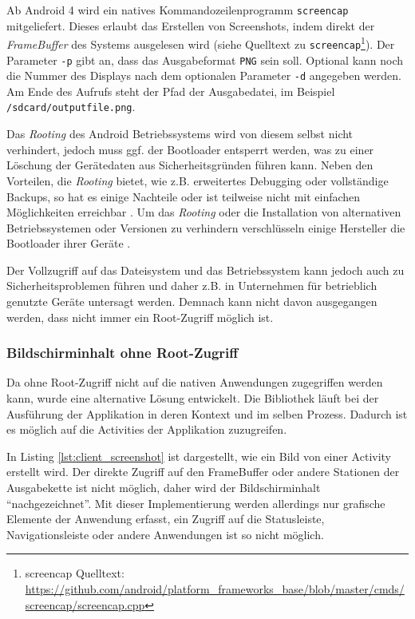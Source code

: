 Ab Android 4 wird ein natives Kommandozeilenprogramm \texttt{screencap} mitgeliefert.
Dieses erlaubt das Erstellen von Screenshots, indem direkt der \emph{FrameBuffer} des Systems ausgelesen wird (siehe Quelltext zu \texttt{screencap}\footnote{screencap Quelltext: \url{https://github.com/android/platform_frameworks_base/blob/master/cmds/screencap/screencap.cpp}}).
Der Parameter \texttt{-p} gibt an, dass das Ausgabeformat \texttt{PNG} sein soll. 
Optional kann noch die Nummer des Displays nach dem optionalen Parameter \texttt{-d} angegeben werden.
Am Ende des Aufrufs steht der Pfad der Ausgabedatei, im Beispiel \texttt{/sdcard/outputfile.png}. 

Das \emph{Rooting} des Android Betriebssystems wird von diesem selbst nicht verhindert, jedoch muss ggf. der Bootloader entsperrt werden, was zu einer Löschung der Gerätedaten aus Sicherheitsgründen führen kann. 
Neben den Vorteilen, die \emph{Rooting} bietet, wie z.B. erweitertes Debugging oder vollständige Backups, so hat es einige Nachteile oder ist teilweise nicht mit einfachen Möglichkeiten erreichbar \cite[vgl.][]{androidsecurity}.
Um das \emph{Rooting} oder die Installation von alternativen Betriebssystemen oder Versionen zu verhindern verschlüsseln einige Hersteller die Bootloader ihrer Geräte \cite[vgl.][6\psq]{androiddataintegrity}.

Der Vollzugriff auf das Dateisystem und das Betriebssystem kann jedoch auch zu Sicherheitsproblemen führen und daher z.B. in Unternehmen für betrieblich genutzte Geräte untersagt werden.
Demnach kann nicht davon ausgegangen werden, dass nicht immer ein Root-Zugriff möglich ist.

\subsubsection{Bildschirminhalt ohne Root-Zugriff}
Da ohne Root-Zugriff nicht auf die nativen Anwendungen zugegriffen werden kann, wurde eine alternative Lösung entwickelt.
Die Bibliothek läuft bei der Ausführung der Applikation in deren Kontext und im selben Prozess.
Dadurch ist es möglich auf die Activities der Applikation zuzugreifen.

In Listing \ref{lst:client_screenshot} ist dargestellt, wie ein Bild von einer Activity erstellt wird.
Der direkte Zugriff auf den FrameBuffer oder andere Stationen der Ausgabekette ist nicht möglich, daher wird der Bildschirminhalt \enquote{nachgezeichnet}.
Mit dieser Implementierung werden allerdings nur grafische Elemente der Anwendung erfasst, ein Zugriff auf die Statusleiste, Navigationsleiste oder andere Anwendungen ist so nicht möglich.

